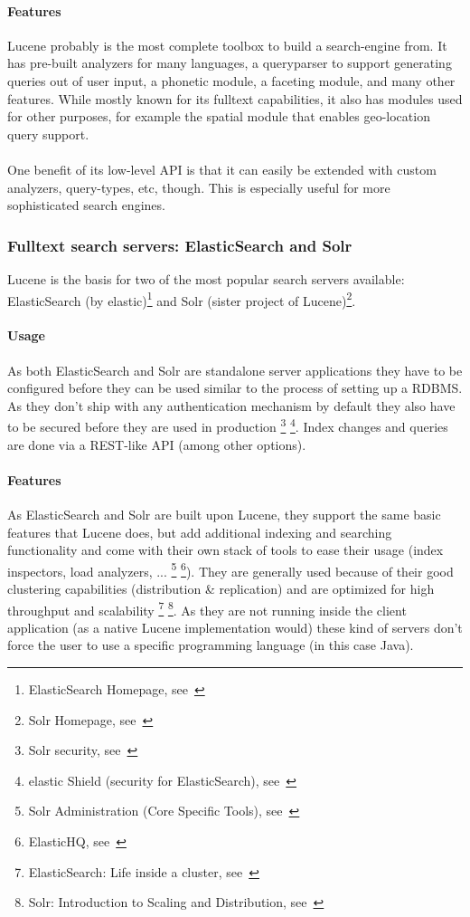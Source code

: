 \paragraph{Features}
Lucene probably is the most complete toolbox to build a search-engine from. It has pre-built analyzers for many languages, a queryparser to support generating queries out of user input, a phonetic module, a faceting module, and many other features. While mostly known for its fulltext capabilities, it also has modules used for other purposes, for example the spatial module that enables geo-location query support.
\\\\
One benefit of its low-level API is that it can easily be extended with custom analyzers, query-types, etc, though. This is especially useful for more sophisticated search engines.

\pagebreak

\subsubsection{Fulltext search servers: ElasticSearch and Solr}
Lucene is the basis for two of the most popular search servers available: ElasticSearch (by elastic)\footnote{ElasticSearch Homepage, see~\cite{elasticsearch_homepage}} and Solr (sister project of Lucene)\footnote{Solr Homepage, see~\cite{solr_homepage}}.

\paragraph{Usage}
As both ElasticSearch and Solr are standalone server applications they have to be configured before they can be used similar to the process of setting up a RDBMS. As they don't ship with any authentication mechanism by default they also have to be secured before they are used in production \footnote{Solr security, see~\cite{solr_security}} \footnote{elastic Shield (security for ElasticSearch), see~\cite{elasticsearch_security}}. Index changes and queries are done via a REST-like API (among other options).

\paragraph{Features}
As ElasticSearch and Solr are built upon Lucene, they support the same basic features that Lucene does, but add additional indexing and searching functionality and come with their own stack of tools to ease their usage (index inspectors, load analyzers, ... \footnote{Solr Administration (Core Specific Tools), see~\cite{solr_admin}} \footnote{ElasticHQ, see~\cite{elasticsearch_admin}}). They are generally used because of their good clustering capabilities (distribution \& replication) and are optimized for high throughput and scalability \footnote{ElasticSearch: Life inside a cluster, see~\cite{elasticsearch_clustering}} \footnote{Solr: Introduction to Scaling and Distribution, see~\cite{solr_clustering}}. As they are not running inside the client application (as a native Lucene implementation would) these kind of servers don't force the user to use a specific programming language (in this case Java).

